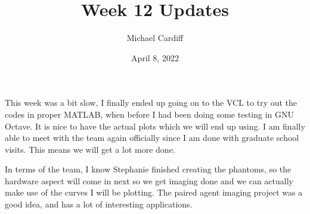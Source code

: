 \documentclass[12pt]{article}
\title{Week 12 Updates}
\author{Michael Cardiff}
\date{April 8, 2022}
\begin{document}
\maketitle
This week was a bit slow, I finally ended up going on to the VCL to try out the codes in proper MATLAB, when before I had been doing some testing in GNU Octave. It is nice to have the actual plots which we will end up using. I am finally able to meet with the team again officially since I am done with graduate school visits. This means we will get a lot more done.

In terms of the team, I know Stephanie finished creating the phantoms, so the hardware aspect will come in next so we get imaging done and we can actually make use of the curves I will be plotting. The paired agent imaging project was a good idea, and has a lot of interesting applications.  
\end{document}

